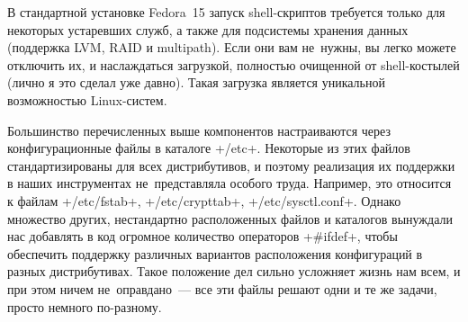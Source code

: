 \documentclass[10pt,oneside,a4paper]{article}
\begin{document}
В стандартной установке Fedora~15 запуск shell-скриптов требуется только для
некоторых устаревших служб, а также для подсистемы хранения данных (поддержка
LVM, RAID и multipath). Если они вам не~нужны, вы легко можете отключить их, и
наслаждаться загрузкой, полностью очищенной от shell-костылей (лично я это
сделал уже давно). Такая загрузка является уникальной возможностью Linux-систем.

Большинство перечисленных выше компонентов настраиваются через конфигурационные
файлы в каталоге +/etc+. Некоторые из этих файлов стандартизированы для всех
дистрибутивов, и поэтому реализация их поддержки в наших инструментах
не~представляла особого труда. Например, это относится к файлам +/etc/fstab+,
+/etc/crypttab+, +/etc/sysctl.conf+. Однако множество других, нестандартно
расположенных файлов и каталогов вынуждали нас добавлять в код огромное
количество операторов +#ifdef+, чтобы обеспечить поддержку различных вариантов
расположения конфигураций в разных дистрибутивах. Такое положение дел сильно
усложняет жизнь нам всем, и при этом ничем не~оправдано~--- все эти файлы решают
одни и те же задачи, просто немного по-разному.
\end{document}
